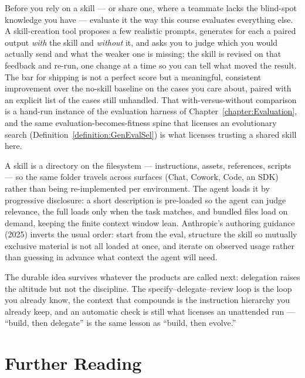 Before you rely on a skill --- or share one, where a teammate lacks the blind-spot knowledge you have --- evaluate it the way this course evaluates everything else.
A skill-creation tool proposes a few realistic prompts, generates for each a paired output \emph{with} the skill and \emph{without} it, and asks you to judge which you would actually send and what the weaker one is missing; the skill is revised on that feedback and re-run, one change at a time so you can tell what moved the result.
The bar for shipping is not a perfect score but a meaningful, consistent improvement over the no-skill baseline on the cases you care about, paired with an explicit list of the cases still unhandled.
That with-versus-without comparison is a hand-run instance of the evaluation harness of Chapter~\ref{chapter:Evaluation}, and the same evaluation-becomes-fitness spine that licenses an evolutionary search (Definition~\ref{definition:GenEvalSel}) is what licenses trusting a shared skill here.

\begin{remark}
A skill is a directory on the filesystem --- instructions, assets, references, scripts --- so the same folder travels across surfaces (Chat, Cowork, Code, an SDK) rather than being re-implemented per environment.
The agent loads it by progressive disclosure: a short description is pre-loaded so the agent can judge relevance, the full  loads only when the task matches, and bundled files load on demand, keeping the finite context window lean.
Anthropic's authoring guidance (2025) inverts the usual order: start from the eval, structure the skill so mutually exclusive material is not all loaded at once, and iterate on observed usage rather than guessing in advance what context the agent will need.
\end{remark}

The durable idea survives whatever the products are called next: delegation raises the altitude but not the discipline.
The specify--delegate--review loop is the loop you already know, the context that compounds is the instruction hierarchy you already keep, and an automatic check is still what licenses an unattended run --- ``build, then delegate'' is the same lesson as ``build, then evolve.''

\section*{Further Reading}

